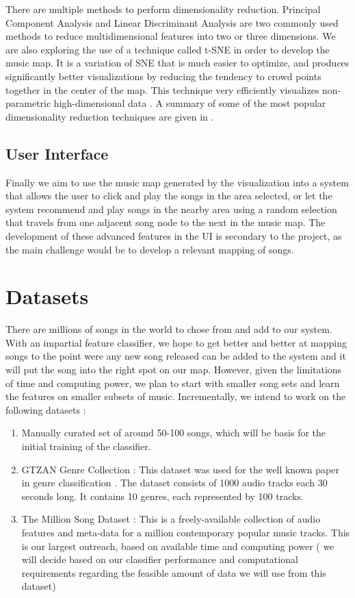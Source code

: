 \documentclass[10pt,twocolumn,letterpaper]{article}
\begin{document}
There are multiple methods to perform dimensionality reduction. Principal Component Analysis \cite{wold1987principal} and Linear Discriminant Analysis \cite{izenman2013linear} are two commonly used methods to reduce multidimensional features into two or three dimensions. We are also exploring the use of a technique called t-SNE \cite{maaten2008visualizing} in order to develop the music map. It is a variation of SNE that is much easier to optimize, and produces significantly better visualizations by reducing the tendency to crowd points together in the center of the map. This technique very efficiently visualizes non-parametric high-dimensional data \cite{van2012self} . A summary of some of the most popular dimensionality reduction techniques are given in \cite{bunte2012general}.

\subsection{User Interface}
Finally we aim to use the music map generated by the visualization into a system that allows the user to click and play the songs in the area selected, or let the system recommend and play songs in the nearby area using a random selection that travels from one adjacent song node to the next in the music map. The development of these advanced features in the UI is secondary to the project, as the main challenge would be to develop a relevant mapping of songs.

\section{Datasets}

There are millions of songs in the world to chose from and add to our system. With an impartial feature classifier, we hope to get better and better at mapping songs to the point were any new song released can be added to the system and it will put the song into the right spot on our map. However, given the limitations of time and computing power, we plan to start with smaller song sets and learn the features on smaller subsets of music. Incrementally, we intend to work on the following datasets :

\begin{enumerate}
	\item Manually curated set of around 50-100 songs, which will be basis for the initial training of the classifier.
	\item GTZAN Genre Collection : 	This dataset was used for the well known paper in genre classification \cite{tzanetakis2002musical}. The dataset consists of 1000 audio tracks each 30 seconds long. It contains 10 genres, each represented by 100 tracks. 
	\item The Million Song Dataset \cite{bertin2011million}: This is a freely-available collection of audio features and meta-data for a million contemporary popular music tracks. This is our largest outreach, based on available time and computing power ( we will decide based on our classifier performance and computational requirements regarding the feasible amount of data we will use from this dataset)
	
\end{enumerate}
\end{document}
